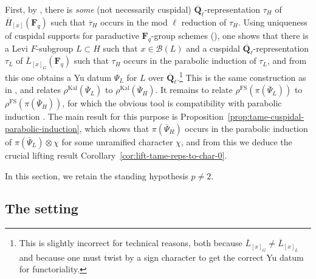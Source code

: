\documentclass[reqno]{amsart}
\numberwithin{equation}{subsection}
\newcommand{\F}{\mathbf{F}}
\newcommand{\Q}{\mathbf{Q}}
\newcommand{\ol}[1]{\overline{#1}}
\newcommand\cB{\mathcal{B}}
\DeclareMathOperator{\FS}{FS}
\DeclareMathOperator{\Kal}{Kal}
\theoremstyle{remark}
\numberwithin{equation}{subsection}
\numberwithin{figure}{subsection}
\begin{document}
First, by \cite[Part III, no.\ 16.1, Theorem 33]{Serre77}, there is \emph{some} (not necessarily cuspidal) $\ol\Q_\ell$-representation $\tau_H$ of $\ol H_{[x]}(\F_q)$ such that $\ol\tau_H$ occurs in the mod $\ell$ reduction of $\tau_H$. Using uniqueness of cuspidal supports for paraductive $\F_q$-group schemes (\cite[Lemma~2.10.2]{Cot26b}), one shows that there is a Levi $F$-subgroup $L \subset H$ such that $x \in \cB(L)$ and a cuspidal $\ol\Q_\ell$-representation $\tau_L$ of $\ol L_{[x]_G}(\F_q)$ such that $\tau_H$ occurs in the parabolic induction of $\tau_L$, and from this one obtains a Yu datum $\Psi_L$ for $L$ over $\ol\Q_\ell$.\footnote{This is slightly incorrect for technical reasons, both because $\ol L_{[x]_G} \neq \ol L_{[x]_L}$ and because one must twist by a sign character to get the correct Yu datum for functoriality.} This is the same construction as in \cite[\S 9]{CF26a}, and \cite[Theorem~9.3.3]{CF26a} relates $\rho^{\Kal}(\ol\Psi_L)$ to $\rho^{\Kal}(\ol\Psi_H)$. It remains to relate $\rho^{\FS}(\pi(\ol\Psi_L))$ to $\rho^{\FS}(\pi(\ol\Psi_H))$, for which the obvious tool is compatibility with parabolic induction \cite[Theorem I.9.6(viii)]{FS}. The main result for this purpose is Proposition~\ref{prop:tame-cuspidal-parabolic-induction}, which shows that $\pi(\ol\Psi_H)$ occurs in the parabolic induction of $\pi(\ol\Psi_L) \otimes \chi$ for some unramified character $\chi$, and from this we deduce the crucial lifting result Corollary~\ref{cor:lift-tame-reps-to-char-0}.

In this section, we retain the standing hypothesis $p \neq 2$.


\subsection{The setting}\label{sss:parabolic-descent-setting}
\end{document}
